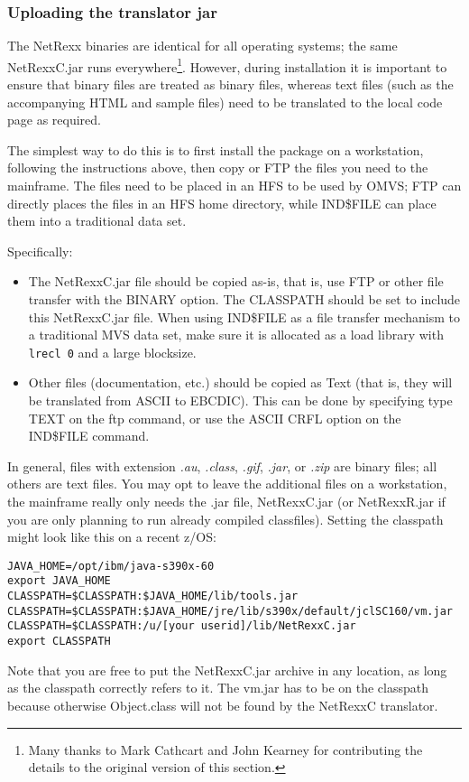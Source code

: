 \subsubsection{Uploading the \nr translator jar}

The NetRexx binaries are identical for all operating systems; the same
NetRexxC.jar runs everywhere\footnote{Many thanks to Mark Cathcart
  and John Kearney for contributing the details to the original version of this section.}.
However, during installation it is important to ensure that binary files
are treated as binary files, whereas text files (such as the
accompanying HTML and sample files) need to be translated to the local code
page as required. 

The simplest way to do this is to first install the package on a
workstation, following the instructions above, then copy or FTP the
files you need to the mainframe.  The files need to be placed in an
HFS to be used by OMVS; FTP can directly places the files in an HFS
home directory, while IND\$FILE can place them into a traditional data
set.

Specifically:
\begin{itemize}
\item The NetRexxC.jar file should be copied as-is, that is, use
FTP or other file transfer with the BINARY option.  The CLASSPATH should
be set to include this NetRexxC.jar file. When using IND\$FILE as a
file transfer mechanism to a traditional MVS data set, make sure it is
allocated as a load library with \texttt{lrecl 0} and a large blocksize.
\item Other files (documentation, etc.) should be copied as Text (that is,
they will be translated from ASCII to EBCDIC). This can be done by specifying type TEXT on the ftp
command, or use the ASCII CRFL option on the IND\$FILE command.
\end{itemize}

In general, files with extension \emph{.au}, \emph{.class}, \emph{.gif}, \emph{.jar},
or \emph{.zip} are binary files; all others are text files. You may
opt to leave the additional files on a workstation, the mainframe
really only needs the .jar file, NetRexxC.jar (or NetRexxR.jar if you
are only planning to run already compiled classfiles).
Setting the classpath might look like this on a recent z/OS:
\begin{verbatim}
JAVA_HOME=/opt/ibm/java-s390x-60
export JAVA_HOME
CLASSPATH=$CLASSPATH:$JAVA_HOME/lib/tools.jar
CLASSPATH=$CLASSPATH:$JAVA_HOME/jre/lib/s390x/default/jclSC160/vm.jar
CLASSPATH=$CLASSPATH:/u/[your userid]/lib/NetRexxC.jar
export CLASSPATH
\end{verbatim}
Note that you are free to put the NetRexxC.jar archive in any
location, as long as the classpath correctly refers to it. The vm.jar
has to be on the classpath because otherwise Object.class will not be
found by the NetRexxC translator.

